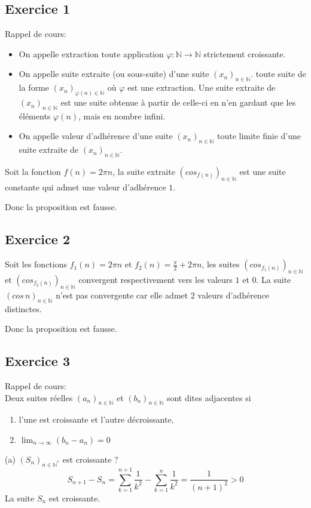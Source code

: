 \documentclass[]{book}
\theoremstyle{definition}
\newcommand{\bb}[1]{\mathbb{#1}}
\newcommand{\N}{\bb{N}}
\begin{document}
\subsection*{Exercice 1}

Rappel de cours: 
\begin{itemize}
\item On appelle extraction toute application $\varphi : \N \to \N$ strictement croissante.
\item On appelle suite extraite (ou sous-suite) d'une suite $(x_n)_{n \in \N}$. toute suite de la forme
$(x_n)_{\varphi(n) \in \N}$ o\`u $\varphi$ est une extraction. Une suite extraite de $(x_n)_{n \in \N}$ est une suite obtenue à partir de celle-ci en n’en gardant que les éléments $\varphi(n)$, mais en nombre infini.
\item On appelle valeur d'adh\'erence d'une suite $(x_n)_{n \in \N}$ toute limite finie d'une suite extraite de $(x_n)_{n \in \N}$.
\end{itemize}


Soit la fonction $f(n) = 2\pi n$, la suite extraite $(cos_{f(n)})_{n \in \N}$ est une suite constante qui admet une valeur d'adh\'erence $1$.

Donc la proposition est fausse.


\subsection*{Exercice 2}
Soit les fonctions $f_1(n) = 2\pi n$ et $f_2(n) = \frac{\pi}{2} + 2\pi n$, les suites $(cos_{f_1(n)})_{n \in \N}$ et $(cos_{f_2(n)})_{n \in \N}$ convergent respectivement vers les valeurs $1$ et $0$. La suite $(cos\, n)_{n \in \N}$ n'est pas convergente car elle admet 2 valeurs d'adh\'erence distinctes. 	

Donc la proposition est fausse.


\subsection*{Exercice 3}
Rappel de cours: \\
Deux suites r\'eelles $(a_n)_{n \in \N}$ et $(b_n)_{n \in \N}$ sont dites adjacentes si
\begin{enumerate}
\item l'une est croissante et l'autre d\'ecroissante,
\item $\lim_{n \to \infty}(b_n - a_n) = 0 $
\end{enumerate}

(a) $(S_n)_{n \in \N^{*}}$ est croissante ?\\
$$S_{n+1} - S_{n} = \sum_{k=1}^{n+1}\frac{1}{k^2} - \sum_{k=1}^{n}\frac{1}{k^2} = \frac{1}{(n+1)^2} > 0$$  
La suite $S_n$ est croissante.\\
\end{document}
